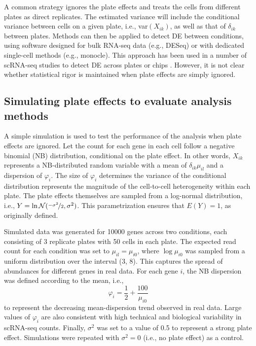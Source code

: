 \documentclass{article}
\begin{document}
A common strategy ignores the plate effects and treats the cells from different plates as direct replicates.
The estimated variance will include the conditional variance between cells on a given plate, i.e., var$(X_{ik})$, as well as that of $\delta_{ik}$ between plates.
Methods can then be applied to detect DE between conditions, using software designed for bulk RNA-seq data (e.g., DESeq) or with dedicated single-cell methods (e.g., monocle).
This approach has been used in a number of scRNA-seq studies to detect DE across plates or chips \cite{kolod2015single,trapnell2014dynamics,avraham2015pathogen}.
However, it is not clear whether statistical rigor is maintained when plate effects are simply ignored.


\subsection{Simulating plate effects to evaluate analysis methods}
A simple simulation is used to test the performance of the analysis when plate effects are ignored.
Let the count for each gene in each cell follow a negative binomial (NB) distribution, conditional on the plate effect.
In other words, $X_{ik}$ represents a NB-distributed random variable with a mean of $\delta_{ik}\mu_{il}$ and a dispersion of $\varphi_i$.
The size of $\varphi_i$ determines the variance of the conditional distribution represents the magnitude of the cell-to-cell heterogeneity within each plate.
The plate effects themselves are sampled from a log-normal distribution, i.e., $Y = \ln \mathcal{N}(\nicefrac{-\sigma^2}{2}, \sigma^2)$.
This parametrization ensures that $E(Y)=1$, as originally defined.

Simulated data was generated for 10000 genes across two conditions, each consisting of 3 replicate plates with 50 cells in each plate.
The expected read count for each condition was set to $\mu_{il}=\mu_{i0}$, where $\log \mu_{i0}$ was sampled from a uniform distribution over the interval (3, 8).
This captures the spread of abundances for different genes in real data. 
For each gene $i$, the NB dispersion was defined according to the mean, i.e., 
\[
    \varphi_i = \frac{1}{2} + \frac{100}{\mu_{i0}} 
\]
to represent the decreasing mean-dispersion trend observed in real data.
Large values of $\varphi_i$ are also consistent with high technical and biological variability in scRNA-seq counts.
Finally, $\sigma^2$ was set to a value of 0.5 to represent a strong plate effect.
Simulations were repeated with $\sigma^2=0$ (i.e., no plate effect) as a control. 
\end{document}
